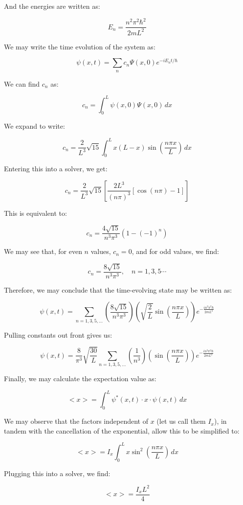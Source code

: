 \begin{enumerate}
    And the energies are written as:

    $$E_n=\frac{n^2\pi^2\hbar^2}{2mL^2}$$

    We may write the time evolution of the system as:

    $$\psi(x,t)=\sum_n c_n \Psi(x,0)e^{-iE_nt/\hbar}$$

    We can find $c_n$ as:

    $$c_n=\int_0^L \psi(x,0)\Psi(x,0)\,dx$$

    We expand to write:

    $$c_n=\frac{2}{L^3}\sqrt{15}\int_0^L x(L-x)\sin\left( \frac{n\pi x}{L} \right)\,dx$$

    Entering this into a solver, we get:

    $$c_n=\frac{2}{L^3}\sqrt{15}\left[ \frac{2L^3}{(n\pi)^3}[\cos(n\pi)-1] \right]$$

    This is equivalent to:

    $$c_n=\frac{4\sqrt{15}}{n^3\pi^3}(1-(-1)^n)$$

    We may see that, for even $n$ values, $c_n=0$, and for odd values, we find:

    $$\boxed{c_n=\frac{8\sqrt{15}}{n^3\pi^3},\quad n=1,3,5\cdots}$$

    Therefore, we may conclude that the time-evolving state may be written as:

    $$\psi(x,t)=\sum_{n=1,3,5,\ldots} \left( \frac{8\sqrt{15}}{n^3\pi^3} \right)\left( \sqrt{\frac{2}{L}}\sin\left( \frac{n\pi x}{L} \right) \right)e^{-\frac{in^2\pi^2\hbar}{2mL^2}}$$

    Pulling constants out front gives us:

    $$\boxed{\psi(x,t)=\frac{8}{\pi^3}\sqrt{\frac{30}{L}}\sum_{n=1,3,5,\ldots} \left( \frac{1}{n^3} \right)\left( \sin\left( \frac{n\pi x}{L} \right) \right)e^{-\frac{in^2\pi^2\hbar}{2mL^2}}}$$

    Finally, we may calculate the expectation value as:

    $$<x>=\int_0^L \psi^*(x,t)\cdot x\cdot \psi(x,t)\,dx$$

    We may observe that the factors independent of $x$ (let us call them $I_x$), in tandem with the cancellation of the exponential, allow this to be simplified to:

    $$<x>=I_x\int_0^L x\sin^2\left( \frac{n\pi x}{L} \right)\,dx$$

    Plugging this into a solver, we find:

    $$<x>=\frac{I_xL^2}{4}$$


\end{enumerate}
